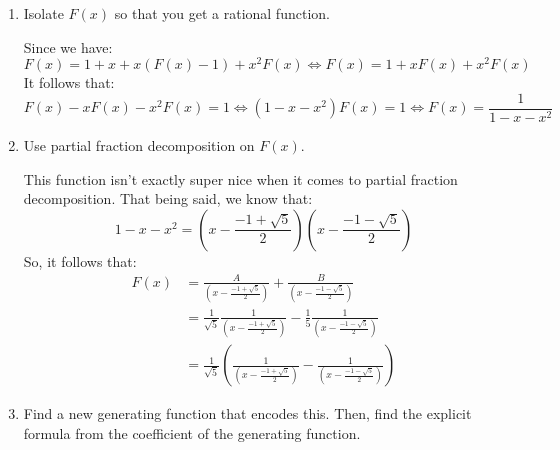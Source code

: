 \documentclass[letterpaper]{article}
\begin{document}
\begin{enumerate}[(1)]
    \item Isolate $F(x)$ so that you get a rational function. 
    
    \bigskip 

    Since we have:
    \[F(x) = 1 + x + x(F(x) - 1) + x^2 F(x) \iff F(x) = 1 + xF(x) + x^2 F(x)\]
    It follows that:
    \[F(x) - xF(x) - x^2 F(x) = 1 \iff (1 - x - x^2)F(x) = 1 \iff F(x) = \boxed{\frac{1}{1 - x - x^2}}\]

    \item Use partial fraction decomposition on $F(x)$. 
    
    \bigskip 

    This function isn't exactly super nice when it comes to partial fraction decomposition. That being said, we know that:
    \[1 - x - x^2 = \left(x - \frac{-1 + \sqrt{5}}{2}\right)\left(x - \frac{-1 - \sqrt{5}}{2}\right)\]
    So, it follows that:
    \begin{equation*}
        \begin{aligned}
            F(x) &= \frac{A}{\left(x - \frac{-1 + \sqrt{5}}{2}\right)} + \frac{B}{\left(x - \frac{-1 - \sqrt{5}}{2}\right)} \\ 
                &= \frac{1}{\sqrt{5}} \frac{1}{\left(x - \frac{-1 + \sqrt{5}}{2}\right)} - \frac{1}{5} \frac{1}{\left(x - \frac{-1 - \sqrt{5}}{2}\right)} \\ 
                &= \frac{1}{\sqrt{5}} \left(\frac{1}{\left(x - \frac{-1 + \sqrt{5}}{2}\right)} - \frac{1}{\left(x - \frac{-1 - \sqrt{5}}{2}\right)}\right)
        \end{aligned}
    \end{equation*}

    \item Find a new generating function that encodes this. Then, find the explicit formula from the coefficient of the generating function. 
    
    \bigskip 


\end{enumerate}
\end{document}
